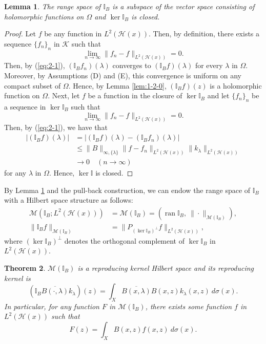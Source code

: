 \documentclass[12pt]{article}
\newtheorem{thm}{Theorem}[section]
\newtheorem{lem}[thm]{Lemma}
\numberwithin{equation}{section}
\newcommand{\M}{{\mathcal M}}
\newcommand{\bI}{{\mathbb I}}
\newcommand{\cH}{{\mathcal H}}
\newcommand{\cK}{{\mathcal K}}
\newcommand{\ran}{\operatorname{ran}}
\newcommand{\lam}{\lambda}
\begin{document}
\begin{lem}\label{lem:2-2}
The range space of $\bI_B$ is a subspace of the vector space consisting of holomorphic functions on $\Omega$ 
and $\ker \bI_B$ is closed. 
\end{lem}

\begin{proof}
Let $f$ be any function in $L^2(\cH(x))$. Then, by definition, there exists a sequence $\{f_n\}_n$ in $\cK$ such that 
\[
\lim_{n\to \infty}\|f_n-f\|_{L^2(\cH(x))}=0.
\]
Then, by (\ref{eq:2-1}), $(\bI_B f_n)(\lam)$ converges to $(\bI_B f)(\lam)$ for every $\lam$ in $\Omega$. 
Moreover, by Assumptions (D) and (E), this convergence is uniform on any compact subset of $\Omega$. 
Hence,  by Lemma \ref{lem:1-2-0}, $(\bI_B f)(z)$ is a holomorphic function on $\Omega$. 
Next, 
let $f$ be a function in the closure of $\ker \bI_B$ and let $\{f_n\}_n$ be a sequence in $\ker \bI_B$ such that 
\[
\lim_{n\to \infty}\|f_n-f\|_{L^2(\cH(x))}=0.
\]
Then, 
by (\ref{eq:2-1}), we have that
\begin{align*}
|(\bI_B f)(\lam)|
&=|(\bI_B f)(\lam)-(\bI_B f_n)(\lam)|\\
&\leq \|B\|_{\infty,\{\lam\}} \|f-f_n\|_{L^2(\cH(x))}\|k_{\lam}\|_{L^2(\cH(x))}\\
&\to 0\quad(n\to \infty)
\end{align*}
for any $\lam$ in $\Omega$. 
Hence, $\ker \bI$ is closed. 
\end{proof}

By Lemma \ref{lem:2-2} and the pull-back construction, 
we can endow the range space of $\bI_B$ with a Hilbert space structure as follows: 
\begin{align*}
\M(\bI_B; L^2(\cH(x)))
&=\M(\bI_B)=(\ran \bI_B,\ \|\cdot\|_{\M(\bI_B)}),\\
\|\bI_B f\|_{\M(\bI_B)}
&=\|P_{(\ker \bI_B)^{\perp}}f\|_{L^2(\cH(x))},
\end{align*}
where $(\ker \bI_B)^{\perp}$ denotes the orthogonal complement of $\ker \bI_B$ in $L^2(\cH(x))$. 
\begin{thm}\label{thm:2-2}
$\M(\bI_B)$ is a reproducing kernel Hilbert space and 
its reproducing kernel is 
\[
\left(\bI_B \overline{B(\cdot,\lam)}k_{\lam}\right)(z)=\int_X\overline{B(x,\lam)}B(x,z)k_{\lam}(x,z)\ d\sigma(x).
\]
In particular, for any function $F$ in $\M(\bI_B)$, there exists some function $f$ in $L^2(\cH(x))$ such that 
\[
F(z)=\int_XB(x,z)f(x,z)\ d\sigma(x).
\]
\end{thm}
\end{document}
